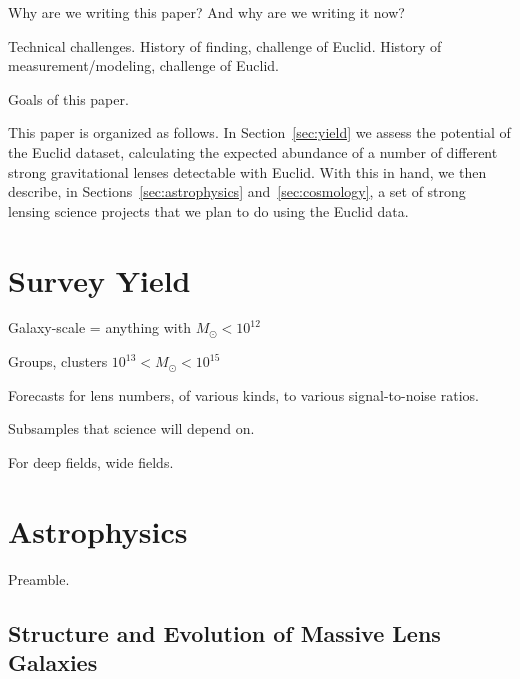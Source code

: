 \documentclass{article}
\begin{document}
Why are we writing this paper? And why are we writing it now?

Technical challenges. History of finding, challenge of Euclid. History of 
measurement/modeling, challenge of Euclid.

Goals of this paper.

This paper is organized as follows. In Section~\ref{sec:yield} we assess the 
potential of the Euclid dataset, calculating the expected abundance of a 
number of different strong gravitational lenses detectable with Euclid. With 
this in hand, we then 
describe, in Sections~\ref{sec:astrophysics} and~\ref{sec:cosmology}, a set 
of strong lensing science projects that we plan to do using the Euclid data.


\section{Survey Yield}



Galaxy-scale = anything with $ M_{\odot} < 10^{12}$

Groups, clusters $ 10^{13}< M_{\odot} < 10^{15}$

Forecasts for lens numbers, of various kinds, to various signal-to-noise ratios. 

Subsamples that science will depend on.

For deep fields, wide fields.



\section{Astrophysics}

Preamble.



\subsection{Structure and Evolution of Massive Lens Galaxies} 
\label{sec:lensgalaxies}

\end{document}
